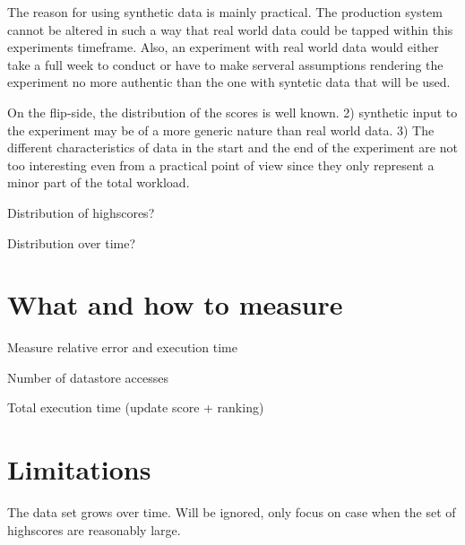 The reason for using synthetic data is mainly practical. The production system cannot be altered in such a way that real world data could be tapped within this experiments timeframe. Also, an experiment with real world data would either take a full week to conduct or have to make serveral assumptions rendering the experiment no more authentic than the one with syntetic data that will be used.

On the flip-side, the distribution of the scores is well known. 2) synthetic input to the experiment may be of a more generic nature than real world data. 3) The different characteristics of data in the start and the end of the experiment are not too interesting even from a practical point of view since they only represent a minor part of the total workload.

\begin{shaded}

  Distribution of highscores?

  Distribution over time?
 
\end{shaded}

\section{What and how to measure}

\begin{shaded}
  Measure relative error and execution time

  Number of datastore accesses

  Total execution time (update score + ranking)
\end{shaded}





\section{Limitations}

The data set grows over time. Will be ignored, only focus on case when the set of highscores are reasonably large.

